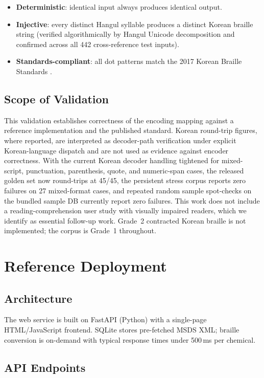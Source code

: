 \documentclass[journal]{IEEEtran}
\begin{document}
\begin{itemize}
\item \textbf{Deterministic}: identical input always produces identical output.
\item \textbf{Injective}: every distinct Hangul syllable produces a distinct Korean braille string (verified algorithmically by Hangul Unicode decomposition and confirmed across all 442 cross-reference test inputs).
\item \textbf{Standards-compliant}: all dot patterns match the 2017 Korean Braille Standards \cite{ko_braille_2017}.
\end{itemize}

\subsection{Scope of Validation}

This validation establishes correctness of the encoding mapping against a reference implementation and the published standard. Korean round-trip figures, where reported, are interpreted as decoder-path verification under explicit Korean-language dispatch and are not used as evidence against encoder correctness. With the current Korean decoder handling tightened for mixed-script, punctuation, parenthesis, quote, and numeric-span cases, the released golden set now round-trips at 45/45, the persistent stress corpus reports zero failures on 27 mixed-format cases, and repeated random sample spot-checks on the bundled sample DB currently report zero failures. This work does not include a reading-comprehension user study with visually impaired readers, which we identify as essential follow-up work. Grade~2 contracted Korean braille is not implemented; the corpus is Grade~1 throughout.

\section{Reference Deployment}
\label{sec:webservice}

\subsection{Architecture}

The web service is built on FastAPI (Python) with a single-page HTML/JavaScript frontend. SQLite stores pre-fetched MSDS XML; braille conversion is on-demand with typical response times under 500\,ms per chemical.

\subsection{API Endpoints}
\end{document}
